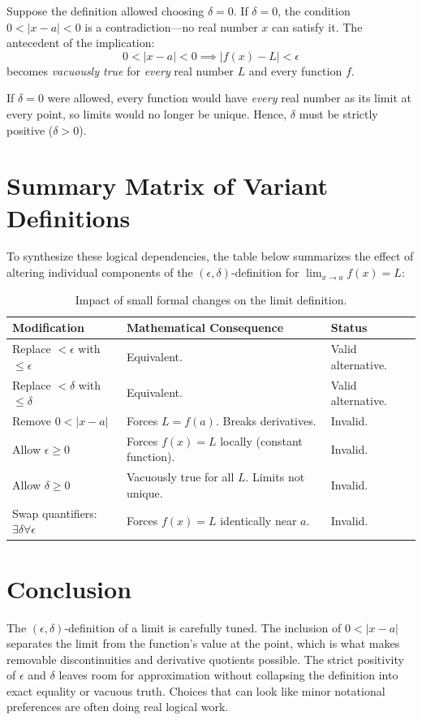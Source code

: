 \documentclass{essay}
\begin{document}
Suppose the definition allowed choosing $\delta = 0$.
If $\delta = 0$, the condition $0 < |x - a| < 0$ is a contradiction—no real number $x$ can satisfy it. The antecedent of the implication:
\[
0 < |x - a| < 0 \implies |f(x) - L| < \epsilon
\]
becomes \emph{vacuously true} for \emph{every} real number $L$ and every function $f$.

If $\delta = 0$ were allowed, every function would have \emph{every} real number as its limit at every point, so limits would no longer be unique. Hence, $\delta$ must be strictly positive ($\delta > 0$).

\section{Summary Matrix of Variant Definitions}

To synthesize these logical dependencies, the table below summarizes the effect of altering individual components of the $(\epsilon, \delta)$-definition for $\lim_{x \to a} f(x) = L$:

\begin{table}[h!]
\centering
\small
\begin{tabular}{|l|l|l|}
\hline
\textbf{Modification} & \textbf{Mathematical Consequence} & \textbf{Status} \\ \hline
Replace $< \epsilon$ with $\le \epsilon$ & Equivalent. & Valid alternative. \\ \hline
Replace $< \delta$ with $\le \delta$ & Equivalent. & Valid alternative. \\ \hline
Remove $0 < |x - a|$ & Forces $L = f(a)$. Breaks derivatives. & Invalid. \\ \hline
Allow $\epsilon \ge 0$ & Forces $f(x) = L$ locally (constant function). & Invalid. \\ \hline
Allow $\delta \ge 0$ & Vacuously true for all $L$. Limits not unique. & Invalid. \\ \hline
Swap quantifiers: $\exists \delta \forall \epsilon$ & Forces $f(x) = L$ identically near $a$. & Invalid. \\ \hline
\end{tabular}
\caption{Impact of small formal changes on the limit definition.}
\end{table}

\section{Conclusion}

The $(\epsilon, \delta)$-definition of a limit is carefully tuned. The inclusion of $0 < |x - a|$ separates the limit from the function's value at the point, which is what makes removable discontinuities and derivative quotients possible. The strict positivity of $\epsilon$ and $\delta$ leaves room for approximation without collapsing the definition into exact equality or vacuous truth. Choices that can look like minor notational preferences are often doing real logical work.
\end{document}
